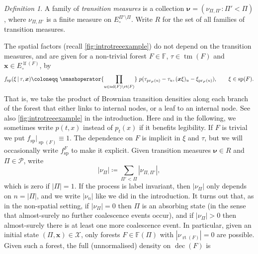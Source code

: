 \documentclass[reqno,draft]{amsart}
\numberwithin{equation}{section}
\theoremstyle{plain}
\theoremstyle{remark}
\newtheorem{definition}[theorem]{Definition}
\DeclareMathOperator{\pr}{pr}
\newcommand{\fpart}{\Pi} %
\newcommand{\nurates}{R} %
\DeclareMathOperator{\lf}{lf}
\DeclareMathOperator{\rt}{rt}
\DeclareMathOperator{\nd}{nd}
\DeclareMathOperator{\dcb}{dec}
\DeclareMathOperator{\dct}{tm}
\DeclareMathOperator{\dcs}{sp}
\newcommand{\smashop}[1]{\,\,\smashoperator{#1}\,\,}
\newcommand{\ftm}{f_\mathrm{tm}^{\boldsymbol \lambda}}
\newcommand{\fsp}{f_\mathrm{sp}}
\newcommand{\nut}[1]{|\nu_{#1}|}
\begin{document}
\begin{definition}\label{def:nurates}
    A family of \emph{transition measures} is a collection $\boldsymbol \nu = (\nu_{\fpart,\fpart'}\colon \fpart'<\fpart)$, where $\nu_{\fpart,\fpart'}$ is a finite measure on $E_\circ ^{\fpart'\setminus \fpart}$. Write $\nurates$ for the set of all families of transition measures.
\end{definition}

The spatial factors (recall \cref{fig:introtreeexample}) do not depend on the transition measures, and are given for a non-trivial forest $F \in \mathbb{F}$, $\tau \in \dct(F)$ and $\boldsymbol x \in E^{\lf(F)}_\circ $, by
\begin{equation}\label{eq:fsp}
    \fsp(\xi\,\vert\, \tau,\boldsymbol x) \coloneqq  \smashop{\prod_{u\in \nd(F)\setminus \rt(F) }} p(\tau_{\pr_F(u)} - \tau_u, (\boldsymbol x \xi)_u - \xi_{\pr_F(u)}),\qquad \xi \in \dcs(F).
\end{equation}
That is, we take the product of Brownian transition densities along each branch of the forest that either links to internal nodes, or a leaf to an internal node. See also \cref{fig:introtreeexample} in the introduction.
Here and in the following, we sometimes write $p(t,x)$ instead of $p_t(x)$ if it benefits legibility.
If $F$ is trivial we put $\fsp \vert_{\dcs(F)} \equiv 1$. The dependence on $F$ is implicit in $\xi$ and $\tau$, but we will occasionally write $\fsp^F$ to make it explicit.
%        
Given transition measures $\boldsymbol \nu \in \nurates$ and $\fpart\in \mathcal{P}$, write \[
    \nut{\fpart} \coloneqq \sum_{\fpart'<\fpart} |\nu_{\fpart,\fpart'}|,
    \] which is zero if $|\fpart| = 1$.
    If the process is label invariant, then $\nut{\fpart}$ only depends on $n = |\fpart|$, and we write $\nut{n}$ like we did in the introduction. It turns out that, as in the non-spatial setting, if $\nut{\fpart} = 0$ then $\fpart$ is an absorbing state (in the sense that almost-surely no further coalescence events occur), and if $\nut{\fpart} > 0$ then almost-surely there is at least one more coalescence event. In particular, given an initial state $(\fpart,\boldsymbol x)\in \mathcal{X}$, only forests $F \in \mathbb{F}(\fpart)$ with $\nut{\rt(F)} = 0$ are possible. Given such a forest, the full (unnormalised) density on $\dcb(F)$ is
\end{document}
